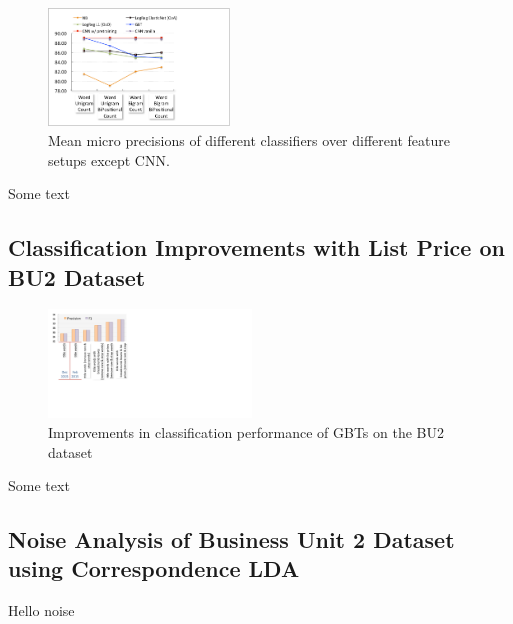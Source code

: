 \begin{figure}
\centering
\includegraphics[width=0.43\textwidth]{images/BU1-mean-micro-precision}
\caption{Mean micro precisions of different classifiers over different feature setups except CNN.}
\label{Figure_BU1-predictions-feature-averages}
\end{figure}
Some text


\subsection{Classification Improvements with List Price on BU2 Dataset}
\label{Subsect:BU2-classification-improve-list-price}

\begin{figure}
	\centering
	\includegraphics[width=0.48\textwidth]{images/BU2-gbt-feature-improvements}
	\caption{Improvements in classification performance of GBTs on the BU2 dataset}
	\label{Figure_BU2-gbt-feature-improvements}
\end{figure}
Some text

\subsection{Noise Analysis of Business Unit 2 Dataset using Correspondence LDA}
\label{Subsect:BU2-noise-analysis}

Hello noise